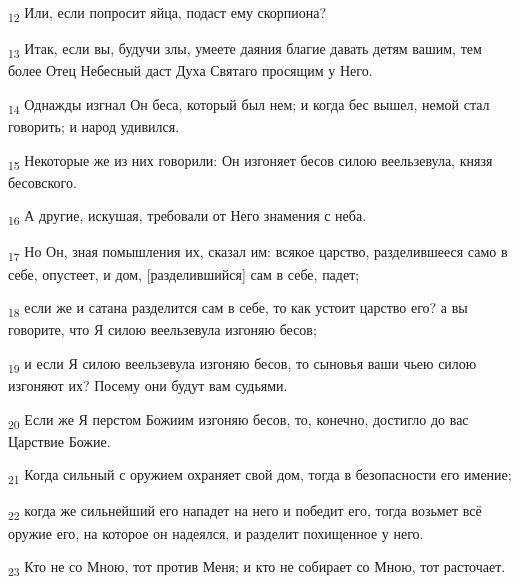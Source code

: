 \begin{tcolorbox}
\textsubscript{12} Или, если попросит яйца, подаст ему скорпиона?
\end{tcolorbox}
\begin{tcolorbox}
\textsubscript{13} Итак, если вы, будучи злы, умеете даяния благие давать детям вашим, тем более Отец Небесный даст Духа Святаго просящим у Него.
\end{tcolorbox}
\begin{tcolorbox}
\textsubscript{14} Однажды изгнал Он беса, который был нем; и когда бес вышел, немой стал говорить; и народ удивился.
\end{tcolorbox}
\begin{tcolorbox}
\textsubscript{15} Некоторые же из них говорили: Он изгоняет бесов силою веельзевула, князя бесовского.
\end{tcolorbox}
\begin{tcolorbox}
\textsubscript{16} А другие, искушая, требовали от Него знамения с неба.
\end{tcolorbox}
\begin{tcolorbox}
\textsubscript{17} Но Он, зная помышления их, сказал им: всякое царство, разделившееся само в себе, опустеет, и дом, [разделившийся] сам в себе, падет;
\end{tcolorbox}
\begin{tcolorbox}
\textsubscript{18} если же и сатана разделится сам в себе, то как устоит царство его? а вы говорите, что Я силою веельзевула изгоняю бесов;
\end{tcolorbox}
\begin{tcolorbox}
\textsubscript{19} и если Я силою веельзевула изгоняю бесов, то сыновья ваши чьею силою изгоняют их? Посему они будут вам судьями.
\end{tcolorbox}
\begin{tcolorbox}
\textsubscript{20} Если же Я перстом Божиим изгоняю бесов, то, конечно, достигло до вас Царствие Божие.
\end{tcolorbox}
\begin{tcolorbox}
\textsubscript{21} Когда сильный с оружием охраняет свой дом, тогда в безопасности его имение;
\end{tcolorbox}
\begin{tcolorbox}
\textsubscript{22} когда же сильнейший его нападет на него и победит его, тогда возьмет всё оружие его, на которое он надеялся, и разделит похищенное у него.
\end{tcolorbox}
\begin{tcolorbox}
\textsubscript{23} Кто не со Мною, тот против Меня; и кто не собирает со Мною, тот расточает.
\end{tcolorbox}
